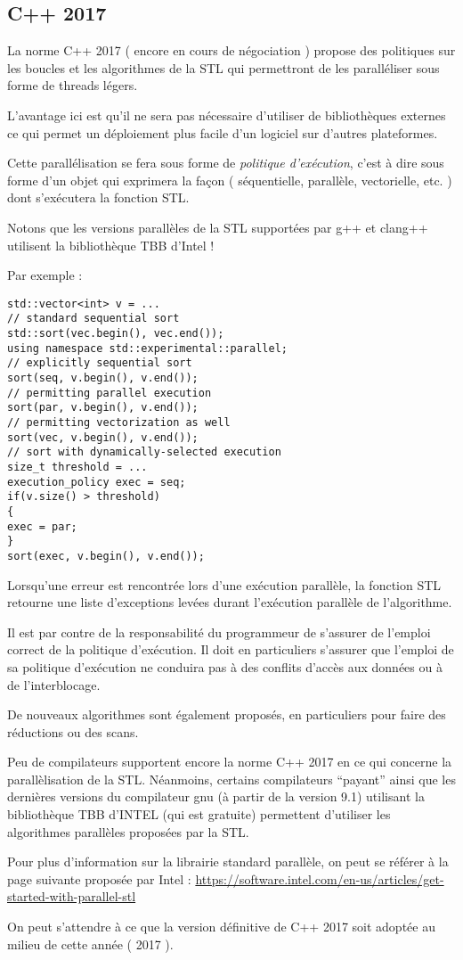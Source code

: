 \documentclass[fleqn,11pt]{article}
\begin{document}
\subsection{C++ 2017}

La norme C++ 2017 ( encore en cours de négociation ) propose des politiques sur les boucles
et les algorithmes de la STL qui permettront de les paralléliser sous forme de threads légers.

L'avantage ici est qu'il ne sera pas nécessaire d'utiliser de bibliothèques externes ce qui permet un
déploiement plus facile d'un logiciel sur d'autres plateformes.

Cette parallélisation se fera sous forme de \textsl{politique d'exécution}, c'est à dire sous
forme d'un objet qui exprimera la façon ( séquentielle, parallèle, vectorielle, etc. ) dont
s'exécutera la fonction STL.

Notons que les versions parallèles de la STL supportées par g++ et clang++ utilisent la bibliothèque TBB
d'Intel !

Par exemple :
\begin{lstlisting}
std::vector<int> v = ...
// standard sequential sort
std::sort(vec.begin(), vec.end());
using namespace std::experimental::parallel;
// explicitly sequential sort
sort(seq, v.begin(), v.end());
// permitting parallel execution
sort(par, v.begin(), v.end());
// permitting vectorization as well
sort(vec, v.begin(), v.end());
// sort with dynamically-selected execution
size_t threshold = ...
execution_policy exec = seq;
if(v.size() > threshold)
{
exec = par;
}
sort(exec, v.begin(), v.end());
\end{lstlisting}

Lorsqu'une erreur est rencontrée lors d'une exécution parallèle, la fonction STL retourne
une liste d'exceptions levées durant l'exécution parallèle de l'algorithme.

Il est par contre de la responsabilité du programmeur de s'assurer de l'emploi correct de la politique
d'exécution. Il doit en particuliers s'assurer que l'emploi de sa politique d'exécution ne conduira pas
à des conflits d'accès aux données ou à de l'interblocage.

De nouveaux algorithmes sont également proposés, en particuliers pour faire des réductions ou des
scans.

Peu de compilateurs supportent encore la norme C++ 2017 en ce qui concerne la parallèlisation de la STL.
Néanmoins, certains compilateurs ``payant'' ainsi que les dernières versions du compilateur gnu (à partir de la version 9.1)
utilisant la bibliothèque TBB d'INTEL (qui est gratuite)  permettent d'utiliser les algorithmes parallèles
proposées par la STL. 

Pour plus d'information sur la librairie standard parallèle, on peut se référer à la page suivante proposée
par Intel :
\url{https://software.intel.com/en-us/articles/get-started-with-parallel-stl}


On peut s'attendre à ce que la version définitive de C++ 2017 soit adoptée au milieu
de cette année ( 2017 ).
\end{document}
